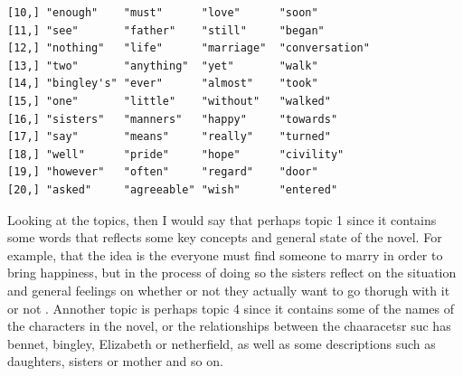 \documentclass[10pt, a4paper, english]{article}\usepackage[]{graphicx}\usepackage[dvipsnames]{xcolor}
\makeatletter
\newenvironment{kframe}{%
 \def\at@end@of@kframe{}%
 \ifinner\ifhmode%
  \def\at@end@of@kframe{\end{minipage}}%
  \begin{minipage}{\columnwidth}%
 \fi\fi%
 \def\FrameCommand##1{\hskip\@totalleftmargin \hskip-\fboxsep
 \colorbox{shadecolor}{##1}\hskip-\fboxsep
     \hskip-\linewidth \hskip-\@totalleftmargin \hskip\columnwidth}%
 \MakeFramed {\advance\hsize-\width
   \@totalleftmargin\z@ \linewidth\hsize
   \@setminipage}}%
 {\par\unskip\endMakeFramed%
 \at@end@of@kframe}
\newenvironment{knitrout}{}{} %
\makeatother
\begin{document}
\begin{knitrout}
\begin{kframe}
\begin{verbatim}
[10,] "enough"    "must"      "love"      "soon"        
[11,] "see"       "father"    "still"     "began"       
[12,] "nothing"   "life"      "marriage"  "conversation"
[13,] "two"       "anything"  "yet"       "walk"        
[14,] "bingley's" "ever"      "almost"    "took"        
[15,] "one"       "little"    "without"   "walked"      
[16,] "sisters"   "manners"   "happy"     "towards"     
[17,] "say"       "means"     "really"    "turned"      
[18,] "well"      "pride"     "hope"      "civility"    
[19,] "however"   "often"     "regard"    "door"        
[20,] "asked"     "agreeable" "wish"      "entered"     
\end{verbatim}
\end{kframe}
\end{knitrout}

Looking at the topics, then I would say that perhaps topic 1 since it contains some words that reflects some key concepts and general state of the novel. For example, that the idea is the everyone must find someone to marry in order to bring happiness, but in the process of doing so the sisters reflect on the situation and general feelings on whether or not they actually want to go thorugh with it or not . Annother topic is perhaps topic 4 since it contains some of the names of the characters in the novel, or the relationships between the chaaracetsr suc has bennet, bingley,  Elizabeth or netherfield, as well as some descriptions such as daughters, sisters or mother and so on. 
\end{document}
